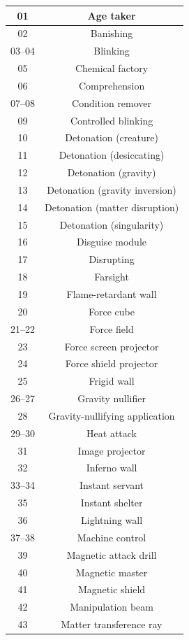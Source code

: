\begin{longtable}{| c | c |}
01 & Age taker \\ \hline
02 & Banishing \\ \hline
03–04 & Blinking \\ \hline
05 & Chemical factory \\ \hline
06 & Comprehension \\ \hline
07–08 & Condition remover  \\ \hline
09 & Controlled blinking \\ \hline
10 & Detonation (creature) \\ \hline
11 & Detonation (desiccating) \\ \hline
12 & Detonation (gravity) \\ \hline
13 & Detonation (gravity inversion) \\ \hline
14 & Detonation (matter disruption) \\ \hline
15 & Detonation (singularity) \\ \hline
16 & Disguise module \\ \hline
17 & Disrupting \\ \hline
18 & Farsight \\ \hline
19 & Flame-retardant wall \\ \hline
20 & Force cube \\ \hline
21–22 & Force field \\ \hline
23 & Force screen projector \\ \hline
24 & Force shield projector \\ \hline
25 & Frigid wall \\ \hline
26–27 & Gravity nullifier \\ \hline
28 & Gravity-nullifying application \\ \hline
29–30 & Heat attack \\ \hline
31 & Image projector \\ \hline
32 & Inferno wall \\ \hline
33–34 & Instant servant \\ \hline
35 & Instant shelter \\ \hline
36 & Lightning wall \\ \hline
37–38 & Machine control \\ \hline
39 & Magnetic attack drill \\ \hline
40 & Magnetic master \\ \hline
41 & Magnetic shield \\ \hline
42 & Manipulation beam \\ \hline
43 & Matter transference ray \\ \hline

\end{longtable}
